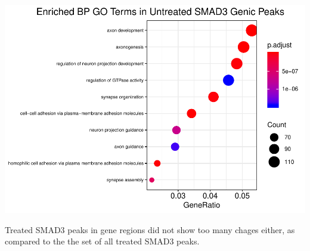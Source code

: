 \documentclass[]{article}
\begin{document}
\clearpage{}

\includegraphics{Bioinfo_Analysis_files/figure-latex/unnamed-chunk-18-1.pdf}

Treated SMAD3 peaks in gene regions did not show too many chages either,
as compared to the the set of all treated SMAD3 peaks.

\clearpage{}
\end{document}

